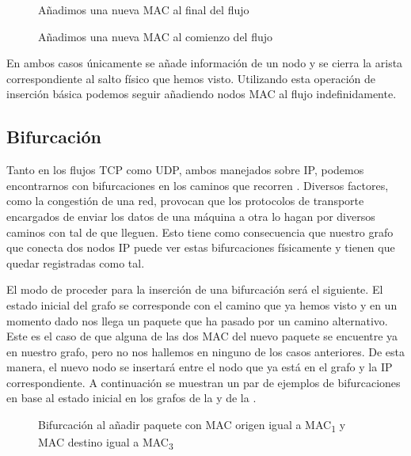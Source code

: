 \documentclass[twoside, 12pt]{epstfg}
\begin{document}

\begin{figure}
\centering

\caption[Ejemplo inserción básica 1]{Añadimos una nueva MAC al final del flujo}
\label{fig:Analisis:AddingLast}
\end{figure}

\begin{figure}
\centering

\caption[Ejemplo inserción básica 2]{Añadimos una nueva MAC al comienzo del flujo}
\label{fig:Analisis:AddingFirst}
\end{figure}

En ambos casos únicamente se añade información de un nodo y se cierra la arista correspondiente al salto físico que hemos visto. Utilizando esta operación de inserción básica podemos seguir añadiendo nodos MAC al flujo indefinidamente.

\subsection{Bifurcación}
Tanto en los flujos TCP como UDP, ambos manejados sobre IP, podemos encontrarnos con bifurcaciones en los caminos que recorren \cite{Priya}. Diversos factores, como la congestión de una red, provocan que los protocolos de transporte encargados de enviar los datos de una máquina a otra lo hagan por diversos caminos con tal de que lleguen. Esto tiene como consecuencia que nuestro grafo que conecta dos nodos IP puede ver estas bifurcaciones físicamente y tienen que quedar registradas como tal.

El modo de proceder para la inserción de una bifurcación será el siguiente. El estado inicial del grafo se corresponde con el camino que ya hemos visto y en un momento dado nos llega un paquete que ha pasado por un camino alternativo. Este es el caso de que alguna de las dos MAC del nuevo paquete se encuentre ya en nuestro grafo, pero no nos hallemos en ninguno de los casos anteriores. De esta manera, el nuevo nodo se insertará entre el nodo que ya está en el grafo y la IP correspondiente. A continuación se muestran un par de ejemplos de bifurcaciones en base al estado inicial en los grafos de la  y de la .

\begin{figure}
\centering

\caption[Ejemplo de bifurcación 1]{Bifurcación al añadir paquete con MAC origen igual a MAC\textsubscript{1} y MAC destino igual a MAC\textsubscript{3}}
\label{fig:Analisis:Bifurcation1}
\end{figure}
\end{document}
